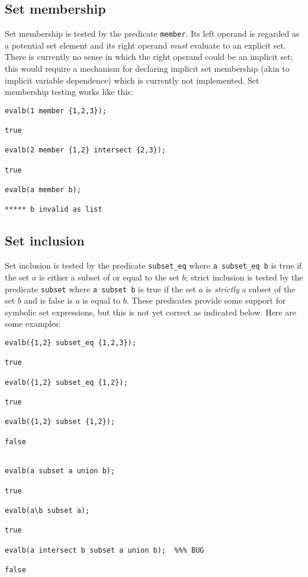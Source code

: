 \subsection{Set membership}

Set membership is tested by the predicate {\tt member}.  Its left
operand is regarded as a potential set element and its right operand
{\em must\/} evaluate to an explicit set.  There is currently no sense
in which the right operand could be an implicit set; this would
require a mechanism for declaring implicit set membership (akin to
implicit variable dependence) which is currently not implemented.  Set
membership testing works like this:
\begin{verbatim}
evalb(1 member {1,2,3});

true

evalb(2 member {1,2} intersect {2,3});

true

evalb(a member b);

***** b invalid as list
\end{verbatim}


\subsection{Set inclusion}

Set inclusion is tested by the predicate {\tt subset\_eq} where {\tt a
subset\_eq b} is true if the set $a$ is either a subset of or equal to
the set $b$; strict inclusion is tested by the predicate {\tt subset}
where {\tt a subset b} is true if the set $a$ is {\em strictly\/} a
subset of the set $b$ and is false is $a$ is equal to $b$.  These
predicates provide some support for symbolic set expressions, but this
is not yet correct as indicated below.  Here are some examples:
\begin{verbatim}
evalb({1,2} subset_eq {1,2,3});

true

evalb({1,2} subset_eq {1,2});

true

evalb({1,2} subset {1,2});

false


evalb(a subset a union b);

true

evalb(a\b subset a);

true

evalb(a intersect b subset a union b);  %%% BUG

false
\end{verbatim}

